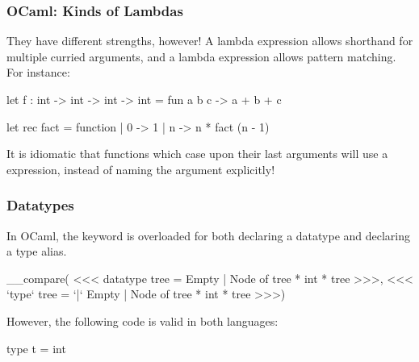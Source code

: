 \documentclass[aspectratio=169, handout]{beamer}
\begin{document}
\begin{frame}[fragile]
  \frametitle{OCaml: Kinds of Lambdas}

  They have different strengths, however! A  lambda expression allows
  shorthand for multiple curried arguments, and a  lambda expression
  allows pattern matching. For instance:

  \vspace{\fill}

  \begin{codeblock}
    let f : int -> int -> int -> int =
      fun a b c -> a + b + c
  \end{codeblock}
  \begin{ocamlcodeblock}
    let rec fact = function
      | 0 -> 1
      | n -> n * fact (n - 1)
  \end{ocamlcodeblock}

  \vspace{\fill}

  It is idiomatic that functions which case upon their last arguments will use a
   expression, instead of naming the argument explicitly!
\end{frame}

\begin{frame}[fragile]
  \frametitle{Datatypes}

  In OCaml, the  keyword is overloaded for both declaring a datatype
  and declaring a type alias.

  \vspace{\fill}

  __compare(
<<<
  datatype tree =
      Empty
    | Node of tree * int * tree
>>>,
<<<
  `type` tree =
    `|` Empty
    | Node of tree * int * tree
>>>)

  \vspace{\fill}

  However, the following code is valid in both languages:
  \vspace{\fill}
  \begin{codeblock}
    type t = int
  \end{codeblock}

  \vspace{\fill}

\end{frame}
\end{document}
